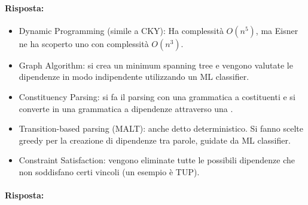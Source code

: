 
\paragraph{Risposta:}

\begin{itemize}
  \item Dynamic Programming (simile a CKY): Ha complessità $O(n^5)$, ma Eisner ne ha scoperto uno con complessità $O(n^3)$. 
  \item Graph Algorithm: si crea un minimum spanning tree e vengono valutate le dipendenze in modo indipendente utilizzando un ML classifier. 
  \item Constituency Parsing: si fa il parsing con una grammatica a costituenti e si converte in una grammatica a dipendenze attraverso una .
  \item Transition-based parsing (MALT): anche detto deterministico. Si fanno scelte greedy per la creazione di dipendenze tra parole, guidate da ML classifier.
  \item Constraint Satisfaction: vengono eliminate tutte le possibili dipendenze che non soddisfano certi vincoli (un esempio è TUP).
\end{itemize}


\paragraph{Risposta:}

